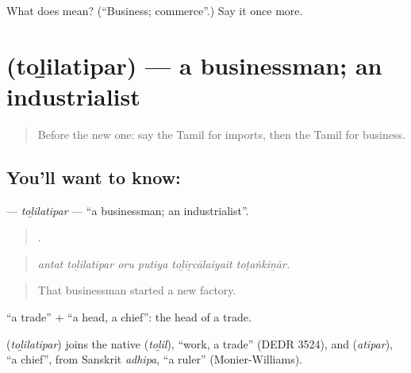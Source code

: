 \begin{tcolorbox}[breakable,colback=teal!4,colframe=teal!35!black,title={Before you move on}]
What does  mean? (\textquotedblleft{}Business; commerce\textquotedblright{}.) Say it once more.
\end{tcolorbox}
\section[\texorpdfstring{\ta{தொழிலதிபர்} (toḻilatipar)}{தொழிலதிபர் (toḻilatipar)}]{ (toḻilatipar) — a businessman; an industrialist}

\label{lesson:TA-C511-tolilatipar}



\begin{quote}
Before the new one: say the Tamil for imports, then the Tamil for business.
\end{quote}

\subsection*{You'll want to know: }
\textbf{} — \emph{toḻilatipar} — \textquotedblleft{}a businessman; an industrialist\textquotedblright{}.

\begin{quote}
     .
\end{quote}

\begin{quote}
\emph{antat toḻilatipar oru putiya toḻiṟcālaiyait toṭaṅkiṉār.}
\end{quote}

\begin{quote}
That businessman started a new factory.
\end{quote}

 \textquotedblleft{}a trade\textquotedblright{} +  \textquotedblleft{}a head, a chief\textquotedblright{}: the head of a trade.

\begin{cousinweb}
\textbf{} (\emph{toḻilatipar}) joins the native  (\emph{toḻil}), \textquotedblleft{}work, a trade\textquotedblright{} (DEDR 3524), and  (\emph{atipar}), \textquotedblleft{}a chief\textquotedblright{}, from Sanskrit \emph{adhipa}, \textquotedblleft{}a ruler\textquotedblright{} (Monier-Williams).
\end{cousinweb}


